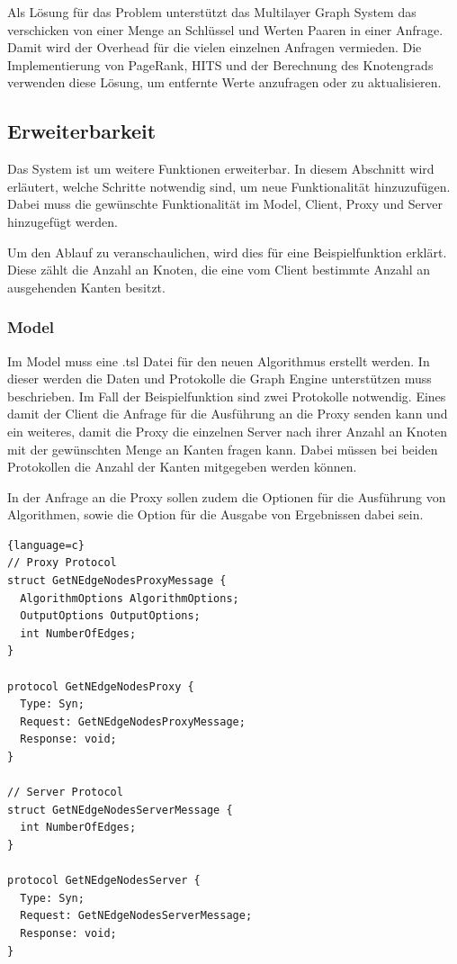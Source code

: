 Als Lösung für das Problem unterstützt das Multilayer Graph System das verschicken von einer Menge an Schlüssel und Werten Paaren in einer Anfrage. Damit wird der Overhead für die vielen einzelnen Anfragen vermieden.
Die Implementierung von PageRank, HITS und der Berechnung des Knotengrads verwenden diese Lösung, um entfernte Werte anzufragen oder zu aktualisieren.


\subsection{Erweiterbarkeit}

Das System ist um weitere Funktionen erweiterbar. In diesem Abschnitt wird erläutert, welche Schritte notwendig sind, um neue Funktionalität hinzuzufügen.
Dabei muss die gewünschte Funktionalität im Model, Client, Proxy und Server hinzugefügt werden.

Um den Ablauf zu veranschaulichen, wird dies für eine Beispielfunktion erklärt. Diese zählt die Anzahl an Knoten, die eine vom Client bestimmte Anzahl an ausgehenden Kanten besitzt.

\subsubsection{Model}

Im Model muss eine .tsl Datei für den neuen Algorithmus erstellt werden. In dieser werden die Daten und Protokolle die Graph Engine unterstützen muss beschrieben. Im Fall der Beispielfunktion sind zwei Protokolle notwendig.
Eines damit der Client die Anfrage für die Ausführung an die Proxy senden kann und ein weiteres, damit die Proxy die einzelnen Server nach ihrer Anzahl an Knoten mit der gewünschten Menge an Kanten fragen kann.
Dabei müssen bei beiden Protokollen die Anzahl der Kanten mitgegeben werden können.

In der Anfrage an die Proxy sollen zudem die Optionen für die Ausführung von Algorithmen, sowie die Option für die Ausgabe von Ergebnissen dabei sein.

\begin{lstlisting}{language=c}
// Proxy Protocol
struct GetNEdgeNodesProxyMessage {
  AlgorithmOptions AlgorithmOptions;
  OutputOptions OutputOptions;
  int NumberOfEdges;  
}

protocol GetNEdgeNodesProxy {
  Type: Syn;
  Request: GetNEdgeNodesProxyMessage;
  Response: void;
}

// Server Protocol
struct GetNEdgeNodesServerMessage {
  int NumberOfEdges;
}

protocol GetNEdgeNodesServer {
  Type: Syn;
  Request: GetNEdgeNodesServerMessage;
  Response: void;
}
\end{lstlisting}

